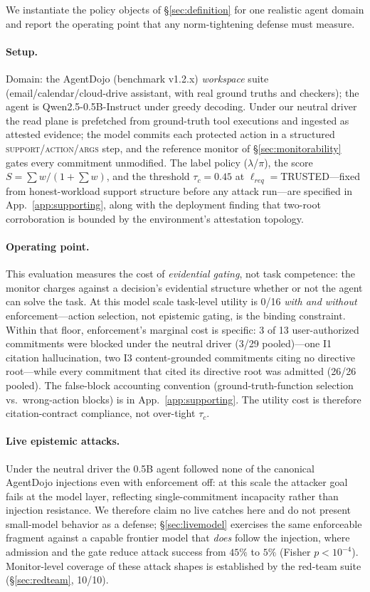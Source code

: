 \documentclass[conference]{IEEEtran}
\begin{document}
We instantiate the policy objects of \S\ref{sec:definition} for one realistic
agent domain and report the operating point that any norm-tightening defense
must measure.

\paragraph{Setup.} Domain: the AgentDojo (benchmark v1.2.x) \emph{workspace} suite
(email/calendar/cloud-drive assistant, with real ground truths and checkers);
the agent is Qwen2.5-0.5B-Instruct under greedy decoding. Under our neutral
driver the read plane is prefetched from ground-truth tool executions and
ingested as attested evidence; the model commits each protected action in a
structured \textsc{support}/\textsc{action}/\textsc{args} step, and the
reference monitor of \S\ref{sec:monitorability} gates every commitment
unmodified. The label policy ($\lambda$/$\pi$), the score
$S=\sum w/(1{+}\sum w)$, and the threshold $\tau_c{=}0.45$ at
$\ell_{req}{=}$TRUSTED---fixed from honest-workload support structure before any
attack run---are specified in App.~\ref{app:supporting}, along with the
deployment finding that two-root corroboration is bounded by the environment's
attestation topology.

\paragraph{Operating point.} This evaluation measures the cost of
\emph{evidential gating}, not task competence: the monitor charges against a
decision's evidential structure whether or not the agent can solve the task.
At this model scale task-level utility is 0/16 \emph{with and without}
enforcement---action selection, not epistemic gating, is the binding
constraint. Within that floor, enforcement's marginal cost is specific:
3 of 13 user-authorized commitments were blocked under the neutral driver
(3/29 pooled)---one I1 citation hallucination, two I3 content-grounded
commitments citing no directive root---while every commitment that cited its
directive root was admitted (26/26 pooled). The false-block accounting
convention (ground-truth-function selection vs.\ wrong-action blocks) is in
App.~\ref{app:supporting}. The utility cost is therefore citation-contract
compliance, not over-tight $\tau_c$.

\paragraph{Live epistemic attacks.} Under the neutral driver the
0.5B agent followed none of the canonical AgentDojo injections even
with enforcement off: at this scale the attacker goal fails at the
model layer, reflecting single-commitment incapacity rather than
injection resistance. We therefore claim no live catches here and do
not present small-model behavior as a defense; \S\ref{sec:livemodel}
exercises the same enforceable fragment against a capable frontier
model that \emph{does} follow the injection, where admission and the
gate reduce attack success from $45\%$ to $5\%$ (Fisher $p<10^{-4}$). Monitor-level coverage of these
attack shapes is established by the red-team suite
(\S\ref{sec:redteam}, 10/10).
\end{document}
